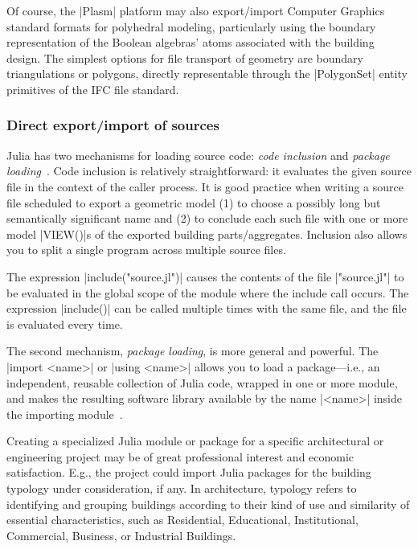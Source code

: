 \begin{coding}
Of course, the |Plasm| platform may also export/import Computer Graphics standard formats for polyhedral modeling, particularly using the boundary representation of the Boolean algebras’ atoms associated with the building design. The simplest options for file transport of geometry are boundary triangulations or polygons, directly representable through the |PolygonSet| entity primitives of the IFC file standard.

\subsubsection*{Direct export/import of sources}\label{sect:4-6-1}

Julia has two mechanisms for loading source code: \emph{code inclusion} and \emph{package loading}~\cite{}.
Code inclusion is relatively straightforward: it evaluates the given source file in the context of the caller process. It is good practice when writing a source file scheduled to export a geometric model (1) to choose a possibly long but semantically significant name and (2) to conclude each such file with one or more model |VIEW()|s of the exported building parts/aggregates. Inclusion also allows you to split a single program across multiple source files.

The expression |include("source.jl")| causes the contents of the file |"source.jl"| to be evaluated in the global scope of the module where the include call occurs. The expression |include()| can be called multiple times with the same file, and the file is evaluated every time. 

The second mechanism, \emph{package loading}, is more general and powerful. The |import <name>| or |using <name>| allows you to load a package—i.e., an independent, reusable collection of Julia code, wrapped in one or more module, and makes the resulting software library available by the name |<name>| inside the importing module~\cite{}. 

\begin{remark}
Creating a specialized Julia module or package for a specific architectural or engineering  project may be of great professional interest and economic satisfaction. 
E.g., the project could import Julia packages for the building typology under consideration, if any. In architecture, typology refers to identifying and grouping buildings according to their kind of use and similarity of essential characteristics, such as Residential, Educational, Institutional, Commercial, Business, or Industrial Buildings.
\end{remark}


\end{coding}
